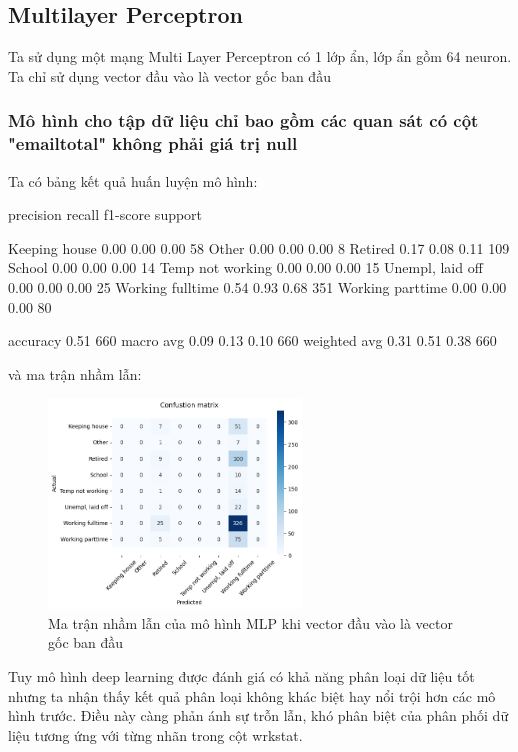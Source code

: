 \subsection{Multilayer Perceptron}

Ta sử dụng một mạng Multi Layer Perceptron có 1 lớp ẩn, lớp ẩn gồm 64 neuron.
Ta chỉ sử dụng vector đầu vào là vector gốc ban đầu

\subsubsection{Mô hình cho tập dữ liệu chỉ bao gồm các quan sát có cột "emailtotal" không phải giá trị null}

Ta có bảng kết quả huấn luyện mô hình:

\begin{python}
                    precision    recall  f1-score   support

   Keeping house       0.00      0.00      0.00        58
           Other       0.00      0.00      0.00         8
         Retired       0.17      0.08      0.11       109
          School       0.00      0.00      0.00        14
Temp not working       0.00      0.00      0.00        15
Unempl, laid off       0.00      0.00      0.00        25
Working fulltime       0.54      0.93      0.68       351
Working parttime       0.00      0.00      0.00        80

        accuracy                           0.51       660
       macro avg       0.09      0.13      0.10       660
    weighted avg       0.31      0.51      0.38       660
\end{python}

và ma trận nhầm lẫn:

\begin{figure}[H]
    \centering
    \includegraphics[width=0.6\textwidth]{figures/Thanh/Models/MLP_Deep_Learning/Non_null_models_confusion_matrix_MLP_original_features.png}
    \caption{Ma trận nhầm lẫn của mô hình MLP khi vector đầu vào là vector gốc ban đầu}
    \label{fig:Non_null_models_confusion_matrix_MLP_original_features}
\end{figure}

Tuy mô hình deep learning được đánh giá có khả năng phân loại dữ liệu tốt nhưng ta nhận thấy kết quả phân loại không khác biệt hay nổi trội hơn các mô hình trước.
Điều này càng phản ánh sự trỗn lẫn, khó phân biệt của phân phối dữ liệu tương ứng với từng nhãn trong cột wrkstat.